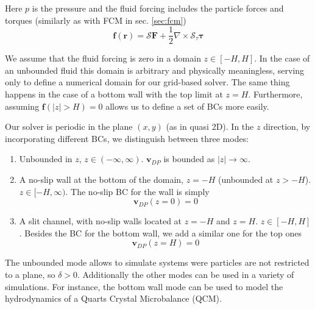 \documentclass[ twoside,openright,titlepage,numbers=noenddot,%
headinclude,footinclude,cleardoublepage=empty,abstract=on,
BCOR=5mm,paper=a4,fontsize=11pt, dvipsnames
]{scrreprt}
\renewcommand{\vec}[1]{\bm{#1}}
\newcommand{\oper}[1]{\mathcal{#1}}
\newcommand{\half}{\frac{1}{2}}
\newcommand{\fpos}{r}
\newcommand{\fvel}{v}
\begin{document}
Here $p$ is the pressure and the fluid forcing includes the particle forces and torques (similarly as with \gls{FCM} in sec. \ref{sec:fcm})
\begin{equation}
  \vec{f}(\vec{\fpos}) = \oper{S}\vec{F} + \half\nabla\times\oper{S}_{\tau}\vec{\tau}
\end{equation}

We assume that the fluid forcing is zero in a domain $z\in [-H, H]$. In the case of an unbounded fluid this domain is arbitrary and physically meaningless, serving only to define a numerical domain for our grid-based solver. The same thing happens in the case of a bottom wall with the top limit at $z=H$. Furthermore, assuming $\vec{f}(|z|>H) = 0$ allows us to define a set of \glspl{BC} more easily.

Our solver is periodic in the plane $(x,y)$ (as in quasi 2D). In the $z$ direction, by incorporating different \glspl{BC}, we distinguish between three modes:
\begin{enumerate}
\item Unbounded in $z$, $z\in(-\infty, \infty)$. $\vec{\fvel}_{DP}$ is bounded as $|z|\rightarrow\infty$.
\item A no-slip  wall at the bottom of the domain, $z=-H$ (unbounded at $z>-H$). $z\in [-H, \infty)$.
  The no-slip \gls{BC} for the wall is simply
  \begin{equation}
    \vec{\fvel}_{DP}(z=0) = 0    
  \end{equation} 
\item A slit channel, with no-slip walls located at $z=-H$ and $z=H$. $z\in [-H, H]$. Besides the \gls{BC} for the bottom wall, we add a similar one for the top ones
  \begin{equation}
    \vec{\fvel}_{DP}(z=H) = 0
  \end{equation}
\end{enumerate}
The unbounded mode allows to simulate systems were particles are not restricted to a plane, so $\delta>0$. Additionally the other modes can be used in a variety of simulations. For instance, the bottom wall mode can be used to model the hydrodynamics of a Quarts Crystal Microbalance (QCM).
\end{document}
